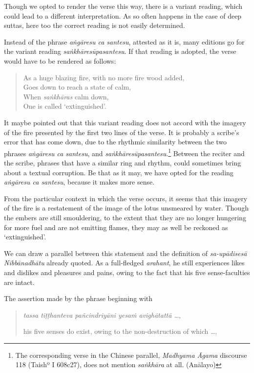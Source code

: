 Though we opted to render the verse this way, there is a variant reading, which could lead to a different interpretation. As so often happens in the case of deep suttas, here too the correct reading is not easily determined.

Instead of the phrase \emph{aṅgāresu ca santesu}, attested as it is, many editions go for the variant reading \emph{saṅkhāresūpasantesu}. If that reading is adopted, the verse would have to be rendered as follows:

\begin{quote}
As a huge blazing fire, with no more fire wood added,\\
Goes down to reach a state of calm,\\
When \emph{saṅkhāras} calm down,\\
One is called `extinguished'.
\end{quote}

It maybe pointed out that this variant reading does not accord with the imagery of the fire presented by the first two lines of the verse. It is probably a scribe's error that has come down, due to the rhythmic similarity between the two phrases \emph{aṅgāresu ca santesu}, and \emph{saṅkhāresūpasantesu}.\footnote{The corresponding verse in the Chinese parallel, \emph{Madhyama Āgama} discourse 118 (Taishº I 608c27), does not mention \emph{saṅkhāra} at all. (Anālayo)} Between the reciter and the scribe, phrases that have a similar ring and rhythm, could sometimes bring about a textual corruption. Be that as it may, we have opted for the reading \emph{aṅgāresu ca santesu}, because it makes more sense.

From the particular context in which the verse occurs, it seems that this imagery of the fire is a restatement of the image of the lotus unsmeared by water. Though the embers are still smouldering, to the extent that they are no longer hungering for more fuel and are not emitting flames, they may as well be reckoned as `extinguished'.

We can draw a parallel between this statement and the definition of \emph{sa-upādisesā Nibbānadhātu} already quoted. As a full-fledged \emph{arahant}, he still experiences likes and dislikes and pleasures and pains, owing to the fact that his five sense-faculties are intact.

The assertion made by the phrase beginning with

\begin{quote}
\emph{tassa tiṭṭhanteva pañcindriyāni yesaṁ avighātattā \ldots{}},

his five senses do exist, owing to the non-destruction of which \ldots,
\end{quote}

